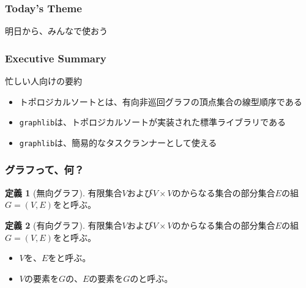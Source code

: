\documentclass[aspectratio=169,dvipdfmx,12pt,notheorems]{beamer}
\theoremstyle{definition}
\newtheorem{definition}{定義}
\begin{document}
\begin{frame}\frametitle{Today's Theme}

\begin{center}
\Huge{明日から、みんなで使おう}
\end{center}

\end{frame}

\begin{frame}\frametitle{Executive Summary}

\begin{block}{忙しい人向けの要約}
\begin{itemize}
\item トポロジカルソートとは、有向非巡回グラフの頂点集合の線型順序である
\item \texttt{graphlib}は、トポロジカルソートが実装された標準ライブラリである
\item \texttt{graphlib}は、簡易的なタスクランナーとして使える
\end{itemize}
\end{block}

\end{frame}

\begin{frame}\frametitle{グラフって、何？}

\begin{definition}[無向グラフ]
有限集合$V$および$V\times V$のからなる集合の部分集合$E$の組$G=(V, E)$をと呼ぶ。
\end{definition}

\begin{definition}[有向グラフ]
有限集合$V$および$V\times V$のからなる集合の部分集合$E$の組$G=(V, E)$をと呼ぶ。
\end{definition}

\begin{itemize}
\item $V$を、$E$をと呼ぶ。
\item $V$の要素を$G$の、$E$の要素を$G$のと呼ぶ。
\end{itemize}

\end{frame}
\end{document}
